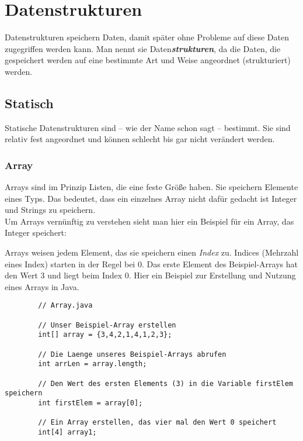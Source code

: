 \chapter{Datenstrukturen}
\begin{flushleft}   
    Datenstrukturen speichern Daten, damit später ohne Probleme auf diese Daten zugegriffen werden kann.
    Man nennt sie Daten\textbf{\textit{strukturen}}, da die Daten, die gespeichert werden auf eine bestimmte Art und Weise angeordnet (strukturiert) werden.
\end{flushleft}

\section{Statisch}
\begin{flushleft}
    Statische Datenstrukturen sind -- wie der Name schon sagt -- bestimmt.
    Sie sind relativ fest angeordnet und können schlecht bis gar nicht verändert werden.
\end{flushleft}

\subsection{Array}
\begin{flushleft}
    Arrays sind im Prinzip Listen, die eine feste Größe haben.
    Sie speichern Elemente eines Typs.
    Das bedeutet, dass ein einzelnes Array nicht dafür gedacht ist Integer und Strings zu speichern. \\
    Um Arrays vernünftig zu verstehen sieht man hier ein Beispiel für ein Array, das Integer speichert:
\end{flushleft}

\begin{center}
\end{center}

\begin{flushleft}
    Arrays weisen jedem Element, das sie speichern einen \textit{Index} zu.
    Indices (Mehrzahl eines Index) starten in der Regel bei $0$.
    Das erste Element des Beispiel-Arrays hat den Wert $3$ und liegt beim Index $0$.
    Hier ein Beispiel zur Erstellung und Nutzung eines Arrays in Java.
    \begin{lstlisting}
        // Array.java
        
        // Unser Beispiel-Array erstellen
        int[] array = {3,4,2,1,4,1,2,3};

        // Die Laenge unseres Beispiel-Arrays abrufen
        int arrLen = array.length;
        
        // Den Wert des ersten Elements (3) in die Variable firstElem speichern
        int firstElem = array[0];

        // Ein Array erstellen, das vier mal den Wert 0 speichert
        int[4] array1;
    \end{lstlisting}
\end{flushleft}

